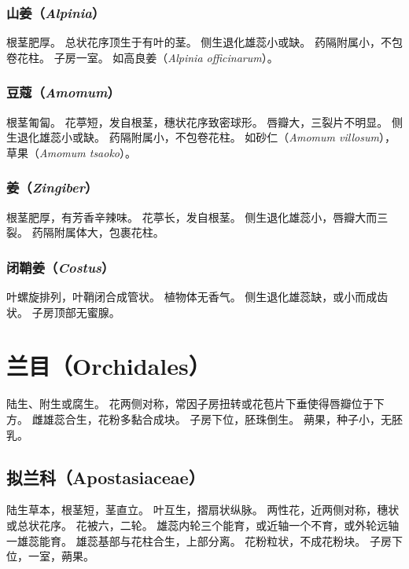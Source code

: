 \documentclass[11pt]{article}
\begin{document}
\begin{sloppypar}
\subsubsection{山姜（\textit{Alpinia}）}
根茎肥厚。
总状花序顶生于有叶的茎。
侧生退化雄蕊小或缺。
药隔附属小，不包卷花柱。
子房一室。
如高良姜（\textit{Alpinia officinarum}）。

\subsubsection{豆蔻（\textit{Amomum}）}
根茎匍匐。
花葶短，发自根茎，穗状花序致密球形。
唇瓣大，三裂片不明显。
侧生退化雄蕊小或缺。
药隔附属小，不包卷花柱。
如砂仁（\textit{Amomum villosum}），草果（\textit{Amomum tsaoko}）。

\subsubsection{姜（\textit{Zingiber}）}
根茎肥厚，有芳香辛辣味。
花葶长，发自根茎。
侧生退化雄蕊小，唇瓣大而三裂。
药隔附属体大，包裹花柱。

\subsubsection{闭鞘姜（\textit{Costus}）}
叶螺旋排列，叶鞘闭合成管状。
植物体无香气。
侧生退化雄蕊缺，或小而成齿状。
子房顶部无蜜腺。

\section{兰目（Orchidales）}
陆生、附生或腐生。
花两侧对称，常因子房扭转或花苞片下垂使得唇瓣位于下方。
雌雄蕊合生，花粉多黏合成块。
子房下位，胚珠倒生。
蒴果，种子小，无胚乳。

\subsection{拟兰科（Apostasiaceae）}
陆生草本，根茎短，茎直立。
叶互生，摺扇状纵脉。
两性花，近两侧对称，穗状或总状花序。
花被六，二轮。
雄蕊内轮三个能育，或近轴一个不育，或外轮远轴一雄蕊能育。
雄蕊基部与花柱合生，上部分离。
花粉粒状，不成花粉块。
子房下位，一室，蒴果。


\end{sloppypar}
\end{document}
